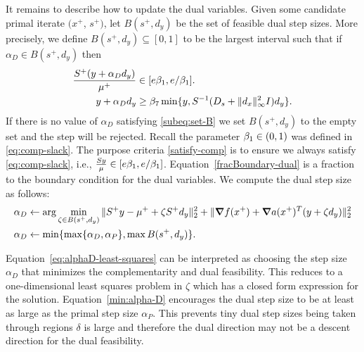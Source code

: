 \documentclass{article}
\begin{document}
It remains to describe how to update the dual variables. Given some candidate primal iterate $(x^{+}$, $s^{+})$,  let $B( s^{+}, d_{y} )$ be the set of feasible dual step sizes. More precisely,  we define $B( s^{+}, d_{y} ) \subseteq [0,1]$ to be the largest interval such that if $\alpha_{D} \in B( s^{+}, d_{y} )$ then
\begin{subequations}\label{subeq:set-B}
\begin{flalign}
 \frac{S^{+} (y + \alpha_{D} d_{y})}{\mu^{+}} &\in [e \beta_{1}, e/\beta_{1} ]. \label{satisfy-comp} \\
y + \alpha_{D} d_{y} &\ge  \beta_{7} \min\{ y ,  S^{-1} (D_{s} + \| d_{x} \|_{\infty}^2 I ) d_{y} \}. \label{fracBoundary-dual}
\end{flalign}
\end{subequations}
If there is no value of $\alpha_{D}$ satisfying \eqref{subeq:set-B} we set $B( s^{+}, d_{y} )$ to the empty set and the step will be rejected. Recall the parameter $\beta_{1} \in (0,1)$ was defined in \eqref{eq:comp-slack}. The purpose criteria \eqref{satisfy-comp} is to ensure we always satisfy \eqref{eq:comp-slack}, i.e., $\frac{S y}{\mu} \in [e \beta_{1}, e/\beta_{1} ]$. Equation~\eqref{fracBoundary-dual} is a fraction to the boundary condition for the dual variables.
 We compute the dual step size as follows:
\begin{subequations}\label{eq:compute-alpha-D}
\begin{flalign}
\alpha_{D} &\gets \arg \min_{\zeta \in B( s^{+}, d_{y} )} \| S^{+} y - \mu^{+} + \zeta S^{+} d_{y} \|^2_{2} + \| \grad \obj(x^{+})   +  \grad \cons(x^{+})^T (y + \zeta d_{y}) \|^{2}_{2} %
\label{eq:alphaD-least-squares} \\
 \alpha_{D} &\gets \min\{ \max\{ \alpha_{D}, \alpha_{P} \}, \max B( s^{+}, d_{y} ) \}. \label{min:alpha-D}
\end{flalign}
\end{subequations}

Equation~\eqref{eq:alphaD-least-squares} can be interpreted as choosing the step size $\alpha_{D}$ that minimizes the complementarity and dual feasibility. This reduces to a one-dimensional least squares problem in $\zeta$ which has a closed form expression for the solution. Equation~\eqref{min:alpha-D} encourages the dual step size to be at least as large as the primal step size $\alpha_{P}$. This prevents tiny dual step sizes being taken through regions $\delta$ is large and therefore the dual direction may not be a descent direction for the dual feasibility.
\end{document}
